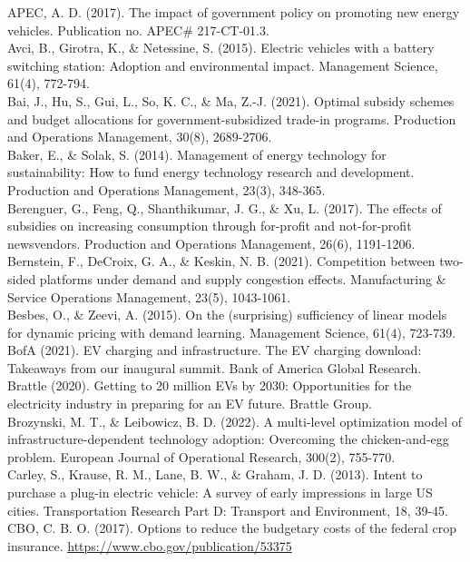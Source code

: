 \documentclass[10pt]{article}
\begin{document}
APEC, A. D. (2017). The impact of government policy on promoting new energy vehicles. Publication no. APEC\# 217-CT-01.3.\\
Avci, B., Girotra, K., \& Netessine, S. (2015). Electric vehicles with a battery switching station: Adoption and environmental impact. Management Science, 61(4), 772-794.\\
Bai, J., Hu, S., Gui, L., So, K. C., \& Ma, Z.-J. (2021). Optimal subsidy schemes and budget allocations for government-subsidized trade-in programs. Production and Operations Management, 30(8), 2689-2706.\\
Baker, E., \& Solak, S. (2014). Management of energy technology for sustainability: How to fund energy technology research and development. Production and Operations Management, 23(3), 348-365.\\
Berenguer, G., Feng, Q., Shanthikumar, J. G., \& Xu, L. (2017). The effects of subsidies on increasing consumption through for-profit and not-for-profit newsvendors. Production and Operations Management, 26(6), 1191-1206.\\
Bernstein, F., DeCroix, G. A., \& Keskin, N. B. (2021). Competition between two-sided platforms under demand and supply congestion effects. Manufacturing \& Service Operations Management, 23(5), 1043-1061.\\
Besbes, O., \& Zeevi, A. (2015). On the (surprising) sufficiency of linear models for dynamic pricing with demand learning. Management Science, 61(4), 723-739.\\
BofA (2021). EV charging and infrastructure. The EV charging download: Takeaways from our inaugural summit. Bank of America Global Research.\\
Brattle (2020). Getting to 20 million EVs by 2030: Opportunities for the electricity industry in preparing for an EV future. Brattle Group.\\
Brozynski, M. T., \& Leibowicz, B. D. (2022). A multi-level optimization model of infrastructure-dependent technology adoption: Overcoming the chicken-and-egg problem. European Journal of Operational Research, 300(2), 755-770.\\
Carley, S., Krause, R. M., Lane, B. W., \& Graham, J. D. (2013). Intent to purchase a plug-in electric vehicle: A survey of early impressions in large US cities. Transportation Research Part D: Transport and Environment, 18, 39-45.\\
CBO, C. B. O. (2017). Options to reduce the budgetary costs of the federal crop insurance. \href{https://www.cbo.gov/publication/53375}{https://www.cbo.gov/publication/53375}\\
\end{document}

